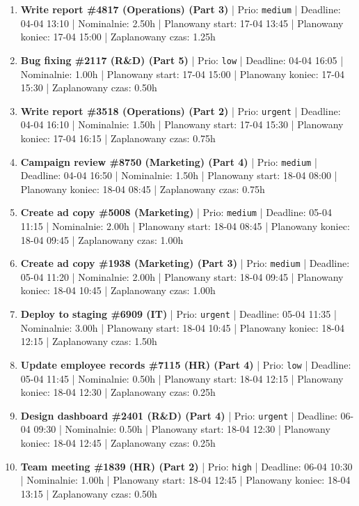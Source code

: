 {\begin{enumerate}
  \item [\textbf{14639}] \textbf{Write report \#4817 (Operations) (Part 3)} | Prio: \texttt{medium} | Deadline: 04-04 13:10 | Nominalnie: 2.50h | Planowany start: 17-04 13:45 | Planowany koniec: 17-04 15:00 | Zaplanowany czas: 1.25h
  \item [\textbf{14689}] \textbf{Bug fixing \#2117 (R\&D) (Part 5)} | Prio: \texttt{low} | Deadline: 04-04 16:05 | Nominalnie: 1.00h | Planowany start: 17-04 15:00 | Planowany koniec: 17-04 15:30 | Zaplanowany czas: 0.50h
  \item [\textbf{14598}] \textbf{Write report \#3518 (Operations) (Part 2)} | Prio: \texttt{urgent} | Deadline: 04-04 16:10 | Nominalnie: 1.50h | Planowany start: 17-04 15:30 | Planowany koniec: 17-04 16:15 | Zaplanowany czas: 0.75h
  \item [\textbf{14632}] \textbf{Campaign review \#8750 (Marketing) (Part 4)} | Prio: \texttt{medium} | Deadline: 04-04 16:50 | Nominalnie: 1.50h | Planowany start: 18-04 08:00 | Planowany koniec: 18-04 08:45 | Zaplanowany czas: 0.75h
  \item [\textbf{14666}] \textbf{Create ad copy \#5008 (Marketing)} | Prio: \texttt{medium} | Deadline: 05-04 11:15 | Nominalnie: 2.00h | Planowany start: 18-04 08:45 | Planowany koniec: 18-04 09:45 | Zaplanowany czas: 1.00h
  \item [\textbf{14652}] \textbf{Create ad copy \#1938 (Marketing) (Part 3)} | Prio: \texttt{medium} | Deadline: 05-04 11:20 | Nominalnie: 2.00h | Planowany start: 18-04 09:45 | Planowany koniec: 18-04 10:45 | Zaplanowany czas: 1.00h
  \item [\textbf{14597}] \textbf{Deploy to staging \#6909 (IT)} | Prio: \texttt{urgent} | Deadline: 05-04 11:35 | Nominalnie: 3.00h | Planowany start: 18-04 10:45 | Planowany koniec: 18-04 12:15 | Zaplanowany czas: 1.50h
  \item [\textbf{14701}] \textbf{Update employee records \#7115 (HR) (Part 4)} | Prio: \texttt{low} | Deadline: 05-04 11:45 | Nominalnie: 0.50h | Planowany start: 18-04 12:15 | Planowany koniec: 18-04 12:30 | Zaplanowany czas: 0.25h
  \item [\textbf{14603}] \textbf{Design dashboard \#2401 (R\&D) (Part 4)} | Prio: \texttt{urgent} | Deadline: 06-04 09:30 | Nominalnie: 0.50h | Planowany start: 18-04 12:30 | Planowany koniec: 18-04 12:45 | Zaplanowany czas: 0.25h
  \item [\textbf{14610}] \textbf{Team meeting \#1839 (HR) (Part 2)} | Prio: \texttt{high} | Deadline: 06-04 10:30 | Nominalnie: 1.00h | Planowany start: 18-04 12:45 | Planowany koniec: 18-04 13:15 | Zaplanowany czas: 0.50h

\end{enumerate}}
